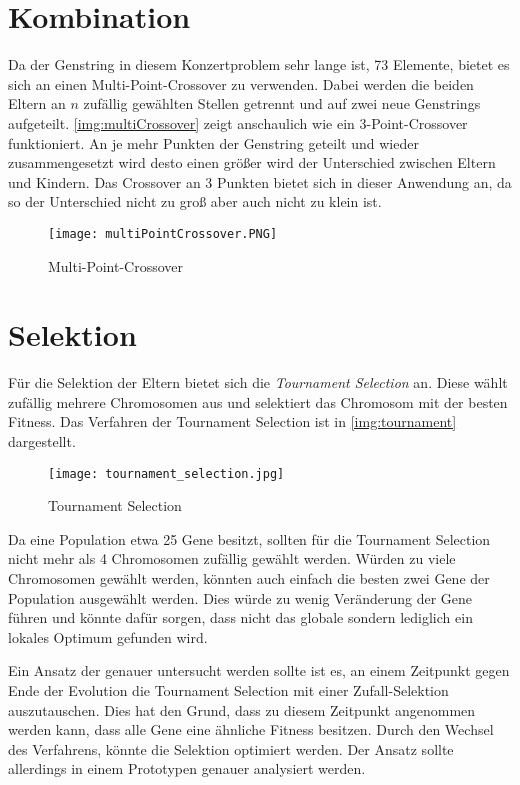 \section{Kombination}\label{sec:eltern}
Da der Genstring in diesem Konzertproblem sehr lange ist, 73 Elemente, bietet es sich an einen Multi-Point-Crossover zu verwenden.
Dabei werden die beiden Eltern an $n$ zufällig gewählten Stellen getrennt und auf zwei neue Genstrings aufgeteilt.
\autoref{img:multiCrossover} zeigt anschaulich wie ein 3-Point-Crossover funktioniert. An je mehr Punkten
der Genstring geteilt und wieder zusammengesetzt wird desto einen größer wird der Unterschied zwischen Eltern und Kindern.
Das Crossover an 3 Punkten bietet sich in dieser Anwendung an, da so der Unterschied nicht zu groß aber auch nicht zu klein ist.

\begin{figure}[h]
    \begin{minipage}{\textwidth}
	    \centering
        \texttt{[image: multiPointCrossover.PNG]}
	    \caption{Multi-Point-Crossover \cite{GEATbx:online}}
        \label{img:multiCrossover}
    \end{minipage}
\end{figure}

\section{Selektion}
Für die Selektion der Eltern bietet sich die \emph{Tournament Selection} an.
Diese wählt zufällig mehrere Chromosomen aus und selektiert das Chromosom mit der besten Fitness. Das Verfahren der
Tournament Selection ist in \autoref{img:tournament} dargestellt.


\begin{figure}
    \begin{minipage}{\textwidth}
        \texttt{[image: tournament\_selection.jpg]}
        \caption{Tournament Selection \cite{TutPoint:online}}
        \label{img:tournament}
    \end{minipage}
\end{figure}

Da eine Population etwa 25 Gene besitzt, sollten für die Tournament Selection nicht mehr als 4 Chromosomen zufällig gewählt werden.
Würden zu viele Chromosomen gewählt werden, könnten auch einfach die besten zwei Gene der Population ausgewählt werden.
Dies würde zu wenig Veränderung der Gene führen und könnte dafür sorgen, dass nicht das globale sondern
lediglich ein lokales Optimum gefunden wird.

Ein Ansatz der genauer untersucht werden sollte ist es, an einem Zeitpunkt gegen Ende der
Evolution die Tournament Selection mit einer Zufall-Selektion auszutauschen.
Dies hat den Grund, dass zu diesem Zeitpunkt angenommen werden kann, dass alle
Gene eine ähnliche Fitness besitzen. Durch den Wechsel des Verfahrens, könnte die Selektion optimiert werden.
Der Ansatz sollte allerdings in einem Prototypen genauer analysiert werden. 